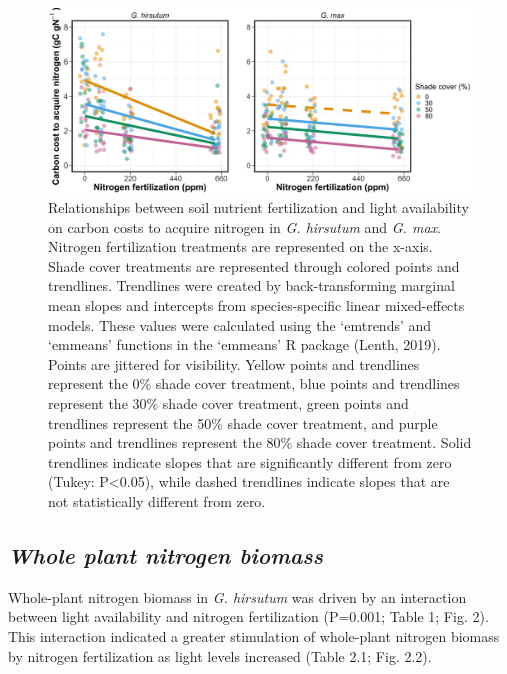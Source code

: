 \newpage
\begin{figure}
    \includegraphics[width=\textwidth]{ch2_LxN_Greenhouse/figs/fig1_ncost.png}
    \centering
    \caption[Relationships between soil nitrogen fertilization and light availability on carbon costs to acquire nitrogen in \textit{G. hirsutum} and \textit{G. max}]{Relationships between soil nutrient fertilization and light availability on carbon costs to acquire nitrogen in \textit{G. hirsutum} and \textit{G. max}. Nitrogen fertilization treatments are represented on the x-axis. Shade cover treatments are represented through colored points and trendlines. Trendlines were created by back-transforming marginal mean slopes and intercepts from species-specific linear mixed-effects models. These values were calculated using the ‘emtrends’ and ‘emmeans’ functions in the ‘emmeans’ R package (Lenth, 2019). Points are jittered for visibility. Yellow points and trendlines represent the 0\% shade cover treatment, blue points and trendlines represent the 30\% shade cover treatment, green points and trendlines represent the 50\% shade cover treatment, and purple points and trendlines represent the 80\% shade cover treatment. Solid trendlines indicate slopes that are significantly different from zero (Tukey: P<0.05), while dashed trendlines indicate slopes that are not statistically different from zero.}

    \label{fig:figure2.1}
\end{figure}
\clearpage


\newpage
\subsection{\textit{Whole plant nitrogen biomass}}
Whole-plant nitrogen biomass in \textit{G. hirsutum} was driven by an interaction between light availability and nitrogen fertilization (P=0.001; Table 1; Fig. 2). This interaction indicated a greater stimulation of whole-plant nitrogen biomass by nitrogen fertilization as light levels increased (Table 2.1; Fig. 2.2).

